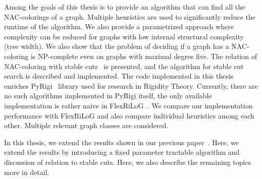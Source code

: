 Among the goals of this thesis is to provide an algorithm
that can find all the NAC-colorings of a graph.
Multiple heuristics are used to significantly
reduce the runtime of the algorithm.
We also provide a parametrized approach where complexity can be reduced for graphs
with low internal structural complexity (tree width).
We also show that the problem of deciding if a graph has a NAC-coloring
is NP-complete even on graphs with maximal degree five.
%
The relation of NAC-coloring with stable cuts~\cite{stable_cuts_2v_4} is presented,
and the algorithm for stable cut search is described and implemented.
%
The code implemented in this thesis enriches PyRigi~\cite{pyrigi}
library used for research in Rigidity Theory.
Currently, there are no such algorithms implemented in PyRigi itself,
the only available implementation is rather naive in FlexRiLoG~\cite{flexrilog}.
We compare our implementation performance with FlexRiLoG and also compare
individual heuristics among each other.
Multiple relevant graph classes are considered.

In this thesis, we extend the results shown in our previous paper~\cite{my_paper}.
Here, we extend the results by introducing a fixed parameter tractable algorithm
and discussion of relation to stable cuts.
Here, we also describe the remaining topics more in detail.


